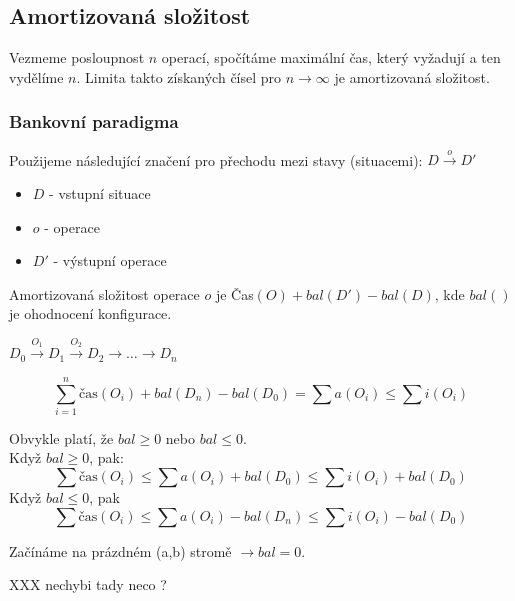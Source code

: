 \subsection{Amortizovaná složitost}

Vezmeme posloupnost $n$ operací, spočítáme maximální čas, který vyžadují a
ten vydělíme $n$. 
Limita takto získaných čísel pro $n \rightarrow \infty$ je amortizovaná
složitost.

\subsubsection{Bankovní paradigma}

Použijeme následující značení pro přechodu mezi stavy (situacemi):
$D \stackrel{o}{\rightarrow} D'$

\begin{itemize}
\item $D$ - vstupní situace 
\item $o$ - operace 
\item $D'$ - výstupní operace 
\end{itemize}

Amortizovaná složitost operace $o$ je Čas$(O) + bal(D') - bal(D)$,
kde $bal()$ je ohodnocení konfigurace.

$D_0 \stackrel{O_1}{\rightarrow} D_1 \stackrel{O_2}{\rightarrow} D_2 \rightarrow \ldots \rightarrow D_n$

$$\sum_{i=1}^{n} \text{čas}(O_i) + bal(D_n) - bal(D_0) = \sum a(O_i) \leq
\sum i(O_i)$$

Obvykle platí, že $bal \geq 0$ nebo $bal \leq 0$. \\
Když $bal \geq 0$, pak: \\
  $$\sum \text{čas}(O_i) \leq \sum a(O_i) + bal(D_0) \leq \sum i(O_i) + bal(D_0)$$
Když $bal \leq 0$, pak \\
  $$\sum \text{čas}(O_i) \leq \sum a(O_i) - bal(D_n) \leq \sum i(O_i) - bal(D_0)$$

Začínáme na prázdném (a,b) stromě $\rightarrow bal = 0$.

XXX nechybi tady neco ?


